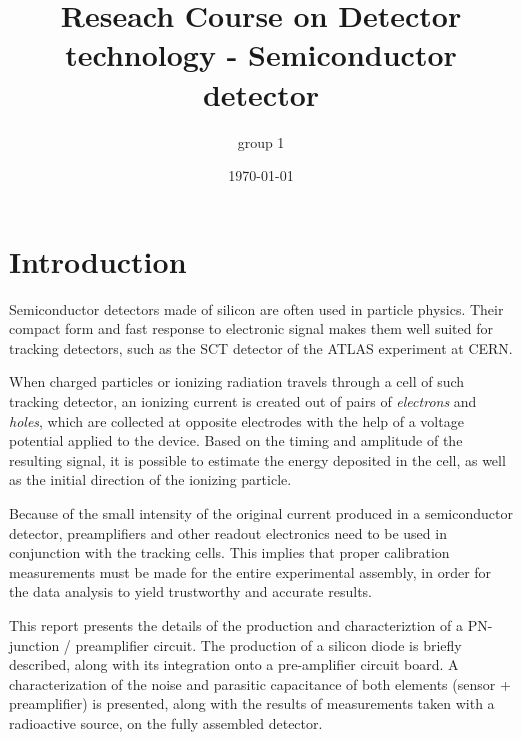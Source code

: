 \documentclass[12pt]{article}
\title{Reseach Course on Detector technology - Semiconductor detector}
\author{group 1}
\date{\today}
\begin{document}

\maketitle

\clearpage
  
\tableofcontents
  
  
  
  
\cleardoublepage

%
%

\section{Introduction}

Semiconductor detectors made of silicon are often used in particle physics. Their compact form and fast response to electronic signal makes them well suited for tracking detectors, such as the SCT detector of the ATLAS experiment at CERN.

When charged particles or ionizing radiation travels through a cell of such tracking detector, an ionizing current is created out of pairs of \textit{electrons} and \textit{holes}, which are collected at opposite electrodes with the help of a voltage potential applied to the device. Based on the timing and amplitude of the resulting signal, it is possible to estimate the energy deposited in the cell, as well as the initial direction of the ionizing particle.

Because of the small intensity of the original current produced in a semiconductor detector, preamplifiers and other readout electronics need to be used in conjunction with the tracking cells. This implies that proper calibration measurements must be made for the entire experimental assembly, in order for the data analysis to yield trustworthy and accurate results.

This report presents the details of the production and characteriztion of a PN-junction / preamplifier circuit. The production of a silicon diode is briefly described, along with its integration onto a pre-amplifier circuit board. A characterization of the noise and parasitic capacitance of both elements (sensor + preamplifier) is presented, along with the results of measurements taken with a radioactive source, on the fully assembled detector. 
\end{document}
